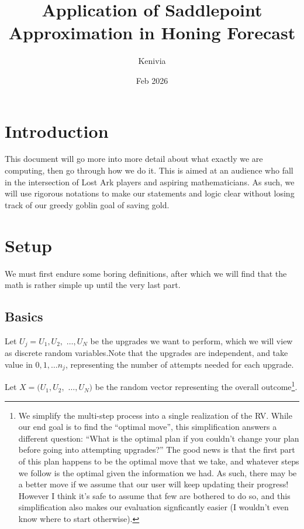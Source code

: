 \documentclass[a4paper,11pt]{article}
\begin{document}


\title{Application of Saddlepoint Approximation in Honing Forecast}
\date{Feb 2026}
\author{Kenivia}

\maketitle
\tableofcontents
\newpage

\section{Introduction}

This document will go more into more detail about what exactly we are computing, then go through how we do it. This is aimed at an audience who fall in the intersection of Lost Ark players and aspiring mathematicians. As such, we will use rigorous notations to make our statements and logic clear without losing track of our greedy goblin goal of saving gold. 


\section{Setup}

We must first endure some boring definitions, after which we will find that the math is rather simple up until the very last part.

\subsection{Basics}
Let $U_j = U_1, U_2,$ $\ldots , U_N$ be the upgrades we want to perform, which we will view as discrete random variables.Note that the upgrades are independent, and take value in $0, 1, \ldots n_j$, representing the number of attempts needed for each upgrade.

Let $X = (U_1, U_2,$ $\ldots , U_N)$ be the random vector representing the overall outcome\footnote{We simplify the multi-step process into a single realization of the RV. While our end goal is to find the ``optimal move'', this simplification answers a different question: ``What is the optimal plan if you couldn't change your plan before going into attempting upgrades?'' The good news is that the first part of this plan happens to be the optimal move that we take, and whatever steps we follow is the optimal given the information we had. As such, there may be a better move if we assume that our user will keep updating their progress! However I think it's safe to assume that few are bothered to do so, and this simplification also makes our evaluation signficantly easier (I wouldn't even know where to start otherwise).
}.
\end{document}
